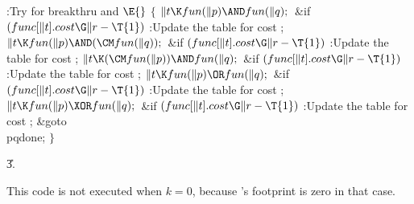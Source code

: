 \B{}:Try for breakthru and \X${}\E{}$\6
${}\{{}$\1\6
${}\|t\K\\{fun}(\|p)\AND\\{fun}(\|q);{}$\6
\&{if} ${}(\\{func}[\|t].\\{cost}\G\|r-\T{1}){}$\1\5
:Update the table for cost \X;\2\6
${}\|t\K\\{fun}(\|p)\AND(\CM\\{fun}(\|q));{}$\6
\&{if} ${}(\\{func}[\|t].\\{cost}\G\|r-\T{1}){}$\1\5
:Update the table for cost \X;\2\6
${}\|t\K(\CM\\{fun}(\|p))\AND\\{fun}(\|q);{}$\6
\&{if} ${}(\\{func}[\|t].\\{cost}\G\|r-\T{1}){}$\1\5
:Update the table for cost \X;\2\6
${}\|t\K\\{fun}(\|p)\OR\\{fun}(\|q);{}$\6
\&{if} ${}(\\{func}[\|t].\\{cost}\G\|r-\T{1}){}$\1\5
:Update the table for cost \X;\2\6
${}\|t\K\\{fun}(\|p)\XOR\\{fun}(\|q);{}$\6
\&{if} ${}(\\{func}[\|t].\\{cost}\G\|r-\T{1}){}$\1\5
:Update the table for cost \X;\2\6
\&{goto} \\{pqdone};\6
\4${}\}{}$\2\par
\U3.\fi

This code is not executed when $k=0$, because 's footprint is zero
in that case.

